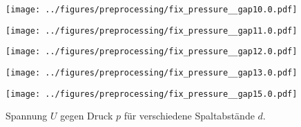 \begin{figure}[p]
    \begin{minipage}[t]{0.31\textwidth}
        \centering
        \texttt{[image: ../figures/preprocessing/fix\_pressure\_\_gap10.0.pdf]}
        \label{fig:fix_pressure_g10}
    \end{minipage}\hfill
    \begin{minipage}[t]{0.31\textwidth}
        \centering
        \texttt{[image: ../figures/preprocessing/fix\_pressure\_\_gap11.0.pdf]}
        \label{fig:fix_pressure_g11}
    \end{minipage}\hfill
    \begin{minipage}[t]{0.31\textwidth}
        \centering
        \texttt{[image: ../figures/preprocessing/fix\_pressure\_\_gap12.0.pdf]}
        \label{fig:fix_pressure_g12}
    \end{minipage}

    \vspace{0.5em}

    \begin{minipage}[t]{0.31\textwidth}
        \centering
        \texttt{[image: ../figures/preprocessing/fix\_pressure\_\_gap13.0.pdf]}
        \label{fig:fix_pressure_g13}
    \end{minipage}\hfill
    \begin{minipage}[t]{0.31\textwidth}
        \centering
        \texttt{[image: ../figures/preprocessing/fix\_pressure\_\_gap15.0.pdf]}
        \label{fig:fix_pressure_g15}
    \end{minipage}

    \caption{Spannung \( U \) gegen Druck \( p \) für verschiedene Spaltabstände \( d \).}
    \label{fig:fix_pressure_all}
\end{figure}
